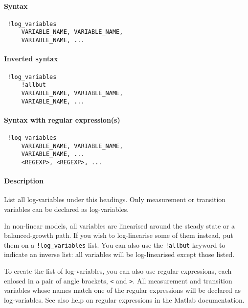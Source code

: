 


	\paragraph{Syntax}
 
 \begin{verbatim}
 !log_variables
     VARIABLE_NAME, VARIABLE_NAME, 
     VARIABLE_NAME, ...
 \end{verbatim}
 
 \paragraph{Inverted syntax}
 
 \begin{verbatim}
 !log_variables
     !allbut
     VARIABLE_NAME, VARIABLE_NAME, 
     VARIABLE_NAME, ...
 \end{verbatim}
 
 \paragraph{Syntax with regular expression(s)}
 
 \begin{verbatim}
 !log_variables
     VARIABLE_NAME, VARIABLE_NAME, 
     VARIABLE_NAME, ...
     <REGEXP>, <REGEXP>, ...
 \end{verbatim}
 
 \paragraph{Description}
 
 List all log-variables under this headings. Only measurement or
 transition variables can be declared as log-variables.
 
 In non-linear models, all variables are linearised around the steady
 state or a balanced-growth path. If you wish to log-linearise some of
 them instead, put them on a \texttt{!log\_variables} list. You can also
 use the \texttt{!allbut} keyword to indicate an inverse list: all
 variables will be log-linearised except those listed.
 
 To create the list of log-variables, you can also use regular
 expressions, each enlosed in a pair of angle brackets,
 \texttt{\textless{}} and \texttt{\textgreater{}}. All measurement and
 transition variables whose names match one of the regular expressions
 will be declared as log-variables. See also help on regular expressions
 in the Matlab documentation.
 
